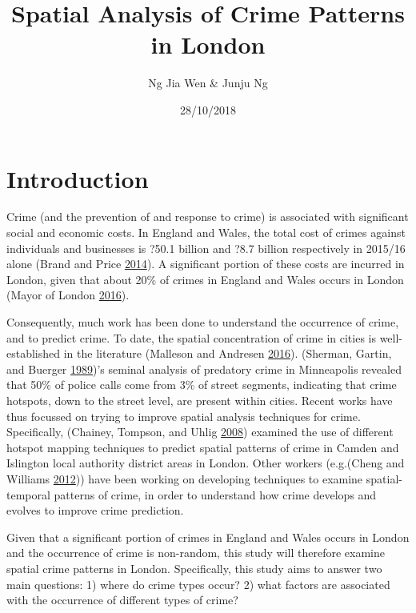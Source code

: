 \documentclass[]{article}
\title{Spatial Analysis of Crime Patterns in London}
\author{Ng Jia Wen \& Junju Ng}
\date{28/10/2018}
\theoremstyle{definition}
\theoremstyle{definition}
\theoremstyle{definition}
\theoremstyle{remark}
\begin{document}
\maketitle

{
\setcounter{tocdepth}{2}
\tableofcontents
}
\pagebreak

\pagebreak

\section{Introduction}\label{introduction}

Crime (and the prevention of and response to crime) is associated with
significant social and economic costs. In England and Wales, the total
cost of crimes against individuals and businesses is ?50.1 billion and
?8.7 billion respectively in 2015/16 alone (Brand and Price
\protect\hyperlink{ref-Brand2014}{2014}). A significant portion of these
costs are incurred in London, given that about 20\% of crimes in England
and Wales occurs in London (Mayor of London
\protect\hyperlink{ref-MayorofLondon2016}{2016}).

Consequently, much work has been done to understand the occurrence of
crime, and to predict crime. To date, the spatial concentration of crime
in cities is well-established in the literature (Malleson and Andresen
\protect\hyperlink{ref-Malleson2016}{2016}). (Sherman, Gartin, and
Buerger \protect\hyperlink{ref-Sherman1989}{1989})'s seminal analysis of
predatory crime in Minneapolis revealed that 50\% of police calls come
from 3\% of street segments, indicating that crime hotspots, down to the
street level, are present within cities. Recent works have thus focussed
on trying to improve spatial analysis techniques for crime.
Specifically, (Chainey, Tompson, and Uhlig
\protect\hyperlink{ref-Chainey2008}{2008}) examined the use of different
hotspot mapping techniques to predict spatial patterns of crime in
Camden and Islington local authority district areas in London. Other
workers (e.g.(Cheng and Williams
\protect\hyperlink{ref-Cheng2012}{2012})) have been working on
developing techniques to examine spatial-temporal patterns of crime, in
order to understand how crime develops and evolves to improve crime
prediction.

Given that a significant portion of crimes in England and Wales occurs
in London and the occurrence of crime is non-random, this study will
therefore examine spatial crime patterns in London. Specifically, this
study aims to answer two main questions: 1) where do crime types occur?
2) what factors are associated with the occurrence of different types of
crime?
\end{document}
